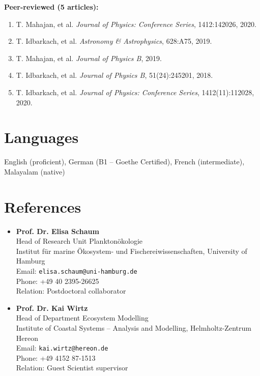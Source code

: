 \documentclass[margin,line,pifont,palatino,courier]{res}
\begin{document}
\begin{resume}
\textbf{Peer-reviewed (5 articles):}
\begin{enumerate}
\item T. Mahajan, et al. \textit{Journal of Physics: Conference Series}, 1412:142026, 2020.
\item T. Idbarkach, et al. \textit{Astronomy \& Astrophysics}, 628:A75, 2019.
\item T. Mahajan, et al. \textit{Journal of Physics B}, 2019.
\item T. Idbarkach, et al. \textit{Journal of Physics B}, 51(24):245201, 2018.
\item T. Idbarkach, et al. \textit{Journal of Physics: Conference Series}, 1412(11):112028, 2020.
\end{enumerate}

\section{\sc Languages}

English (proficient), German (B1 -- Goethe Certified), French (intermediate), Malayalam (native)

\section{\sc References}

\begin{itemize}
\item {\bf Prof. Dr. Elisa Schaum}\\
Head of Research Unit Plankton\"okologie\\
Institut f\"ur marine \"Okosystem- und Fischereiwissenschaften, University of Hamburg\\
Email: \texttt{elisa.schaum@uni-hamburg.de}\\
Phone: +49 40 2395-26625\\
Relation: Postdoctoral collaborator

\item {\bf Prof. Dr. Kai Wirtz}\\
Head of Department Ecosystem Modelling\\
Institute of Coastal Systems -- Analysis and Modelling, Helmholtz-Zentrum Hereon\\
Email: \texttt{kai.wirtz@hereon.de}\\
Phone: +49 4152 87-1513\\
Relation: Guest Scientist supervisor
\end{itemize}

\end{resume}
\end{document}

